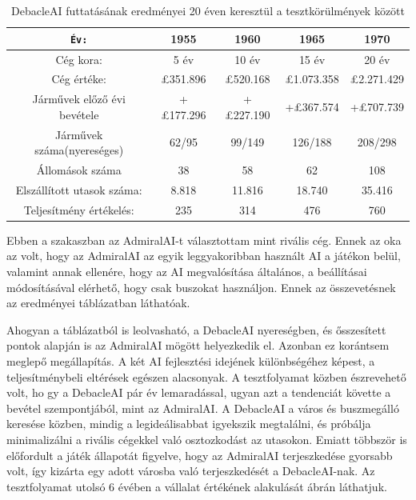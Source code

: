 \begin{table}
	\centering
	\begin{tabular}{|c || c | c | c | c |} 
		\hline
		\texttt{Év:} & 1955 & 1960 & 1965 & 1970 \\ 
		\hline\hline
		Cég kora: & 5 év & 10 év & 15 év & 20 év  \\ 
		\hline
		Cég értéke: &  \pounds 351.896 & \pounds 520.168  & \pounds 1.073.358 & \pounds 2.271.429\\
		\hline
		Járművek előző évi bevétele & +\pounds 177.296 & +\pounds 227.190  & +\pounds 367.574 & +\pounds 707.739 \\
		\hline
		Járművek száma(nyereséges) & 62/95 & 99/149 & 126/188 & 208/298 \\
		\hline
		Állomások száma & 38 & 58 & 62 & 108 \\ 
		\hline
		Elszállított utasok száma: & 8.818 & 11.816 & 18.740 & 35.416  \\
		\hline
		Teljesítmény értékelés: & 235 & 314 & 476 & 760 \\ 
		\hline
	\end{tabular}
	\caption{DebacleAI futtatásának eredményei 20 éven keresztül a tesztkörülmények között}
	\label{tab:debacle20} 
\end{table}


Ebben a szakaszban az AdmiralAI-t választottam mint rivális cég. Ennek az oka az volt, hogy az AdmiralAI az egyik leggyakoribban használt AI a játékon belül, valamint annak ellenére, hogy az AI megvalósítása általános, a beállításai módosításával elérhető, hogy csak buszokat használjon. Ennek az összevetésnek az eredményei  táblázatban láthatóak.

Ahogyan a táblázatból is leolvasható, a DebacleAI nyereségben, és ősszesített pontok alapján is az AdmiralAI mögött helyezkedik el. Azonban ez korántsem meglepő megállapítás. A két AI fejlesztési idejének különbségéhez képest, a teljesítménybeli eltérések egészen alacsonyak. A tesztfolyamat közben észrevehető volt, ho gy a DebacleAI pár év lemaradással, ugyan azt a tendenciát követte a bevétel szempontjából, mint az AdmiralAI. A DebacleAI a város és buszmegálló keresése közben, mindig a legideálisabbat igyekszik megtalálni, és próbálja minimalizálni a rivális cégekkel való osztozkodást az utasokon. Emiatt többször is előfordult a játék állapotát figyelve, hogy az AdmiralAI terjeszkedése gyorsabb volt, így kizárta egy adott városba való terjeszkedését a DebacleAI-nak. Az tesztfolyamat utolsó 6 évében a vállalat értékének alakulását  ábrán láthatjuk.

